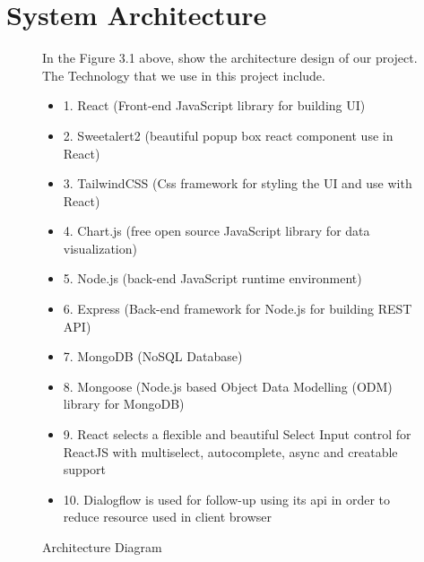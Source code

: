 \documentclass[12pt,oneside,openright,a4paper]{cpe-english-project}
\begin{document}
  \section{System Architecture}
  \begin{figure}[!h]
    \centering
    \caption{Architecture Diagram}\label{fig:System_Architecture}
    \begin{flushleft}
      \qquad In the Figure 3.1 above, show the architecture design of our project. The Technology that we use in this project include. \par
      \begin{itemize}
        \item[] 1. React (Front-end JavaScript library for building UI)
        \item[] 2. Sweetalert2 (beautiful popup box react component use in React)
        \item[] 3. TailwindCSS (Css framework for styling the UI and use with React)
        \item[] 4. Chart.js (free open source JavaScript library for data visualization)
        \item[] 5. Node.js (back-end JavaScript runtime environment)
        \item[] 6. Express (Back-end framework for Node.js for building REST API)
        \item[] 7. MongoDB (NoSQL Database)
        \item[] 8. Mongoose (Node.js based Object Data Modelling (ODM) library for MongoDB)
        \item[] 9. React selects a flexible and beautiful Select Input control for ReactJS with multiselect, autocomplete, async and creatable support
        \item[] 10. Dialogflow is used for follow-up using its api in order to reduce resource used in client browser
      \end{itemize}
    \end{flushleft}        
  \end{figure}
\end{document}

